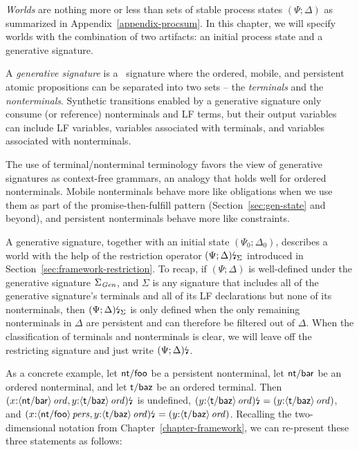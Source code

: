 {\it Worlds} are nothing more or less than sets of stable process states
$(\Psi; \Delta)$ as summarized in Appendix~\ref{appendix-procsum}.
In this chapter, we will specify worlds with the combination of two
artifacts: an initial process state and a generative signature.

\bigskip
\begin{definition}\label{def:gensig}
  A {\em generative signature} is a \sls~signature where the ordered,
  mobile, and persistent atomic propositions can be separated into two
  sets -- the {\em terminals} and the {\em nonterminals}. Synthetic
  transitions enabled by a generative signature only consume (or
  reference) nonterminals and LF terms, but their output variables can
  include LF variables, variables associated with terminals, and
  variables associated with nonterminals.
\end{definition}
\bigskip

\noindent
The use of terminal/nonterminal terminology favors the view of
generative signatures as context-free grammars, an analogy that holds
well for ordered nonterminals. Mobile nonterminals behave more like
obligations when we use them as part of the promise-then-fulfill
pattern (Section~\ref{sec:gen-state} and beyond), and persistent
nonterminals behave more like constraints.

A generative signature, together with an initial state $(\Psi_0;
\Delta_0)$, describes a world with the help of the restriction
operator ${(\Psi; \Delta)}{\mbox{\lightning}}_{\Sigma}$ introduced in
Section~\ref{sec:framework-restriction}. To recap, if $(\Psi; \Delta)$
is well-defined under the generative signature $\Sigma_{\it Gen}$, and
$\Sigma$ is any signature that includes all of the generative
signature's terminals and all of its LF declarations but none of its
nonterminals, then ${(\Psi; \Delta)}{\mbox{\lightning}}_{\Sigma}$ is only
defined when the only remaining nonterminals in $\Delta$ are
persistent and can therefore be filtered out of $\Delta$.
When the
classification of terminals and nonterminals is clear, we will leave
off the restricting signature and just write ${(\Psi;
  \Delta)}{\mbox{\lightning}}_{}$. 

As a concrete example, let ${\sf nt/foo}$ be a persistent nonterminal,
let ${\sf nt/bar}$ be an ordered nonterminal, and let ${\sf t/baz}$ be
an ordered terminal. Then ${(x{:}{\langle {\sf
      nt/bar} \rangle}\,{{\it ord}}, y{:}{\langle {\sf t/baz} \rangle}\,{{\it ord}})}{\mbox{\lightning}}_{}$ is undefined,
${(y{:}{\langle {\sf t/baz} \rangle}\,{{\it ord}})}{\mbox{\lightning}}_{} =
{(y{:}{\langle {\sf t/baz} \rangle}\,{{\it ord}})}$, and
${(x{:}{\langle {\sf nt/foo} \rangle}\,{{\it pers}}, y{:}{\langle {\sf
      t/baz} \rangle}\,{{\it ord}})}{\mbox{\lightning}}_{} = {(y{:}{\langle {\sf t/baz} \rangle}\,{{\it ord}})}$.  Recalling the
two-dimensional notation from Chapter~\ref{chapter-framework}, we can
re-present these three statements as follows:

